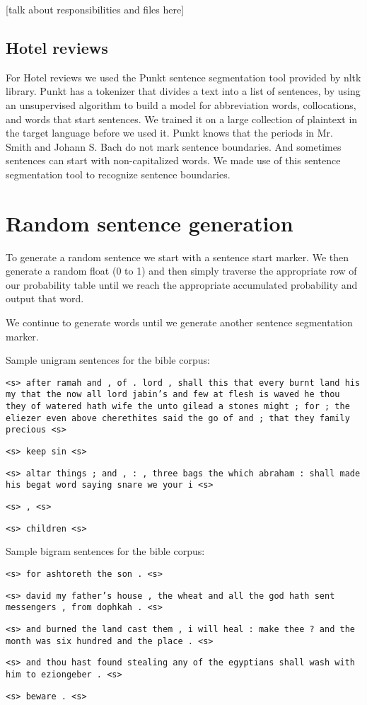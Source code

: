 \documentclass{article}
\begin{document}
[talk about responsibilities and files here]

\subsection{Hotel reviews}
For Hotel reviews we used the Punkt sentence segmentation tool provided by nltk library. Punkt has a tokenizer that divides a text into a list of sentences, by using an unsupervised algorithm to build a model for abbreviation words, collocations, and words that start sentences. We trained it on a large collection of plaintext in the target language before we used it. Punkt knows that the periods in Mr. Smith and Johann S. Bach do not mark sentence boundaries. And sometimes sentences can start with non-capitalized words. We made use of this sentence segmentation tool to recognize sentence boundaries. 

\section{Random sentence generation}
To generate a random sentence we start with a sentence start marker. We then generate a random float (0 to 1)
and then simply traverse the appropriate row of our probability table until we reach the appropriate accumulated probability and output that word.\par

We continue to generate words until we generate another sentence segmentation marker.

\iffalse
\vspace{2mm}
\setlength{\parindent}{0cm}
\newcommand\npar{\par\smallskip}
Sample unigram sentences for the bible corpus:\npar
\texttt{<s> after ramah and , of . lord , shall this that every burnt land his my that the now all lord jabin's and few at flesh is waved he thou they of watered hath wife the unto gilead a stones might ; for ; the eliezer even above cherethites said the go of and ; that they family precious <s>}\npar
\texttt{<s> keep sin <s>}\npar
\texttt{<s> altar things ; and , : , three bags the which abraham : shall made his begat word saying snare we your i <s>}\npar
\texttt{<s> , <s>}\npar
\texttt{<s> children <s>}\npar
\bigskip

Sample bigram sentences for the bible corpus:\npar
\texttt{<s> for ashtoreth the son . <s>}\npar
\texttt{<s> david my father's house , the wheat and all the god hath sent messengers , from dophkah . <s>}\npar
\texttt{<s> and burned the land cast them , i will heal : make thee ? and the month was six hundred and the place . <s>}\npar
\texttt{<s> and thou hast found stealing any of the egyptians shall wash with him to eziongeber . <s>}\npar
\texttt{<s> beware . <s>}\npar
\bigskip
\end{document}
